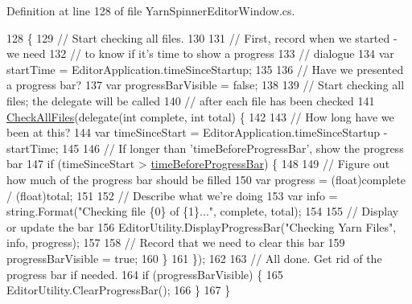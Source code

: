 Definition at line 128 of file Yarn\-Spinner\-Editor\-Window.\-cs.


\begin{DoxyCode}
128                                  \{
129             \textcolor{comment}{// Start checking all files.}
130 
131             \textcolor{comment}{// First, record when we started - we need}
132             \textcolor{comment}{// to know if it's time to show a progress}
133             \textcolor{comment}{// dialogue}
134             var startTime = EditorApplication.timeSinceStartup;
135 
136             \textcolor{comment}{// Have we presented a progress bar?}
137             var progressBarVisible = \textcolor{keyword}{false};
138 
139             \textcolor{comment}{// Start checking all files; the delegate will be called}
140             \textcolor{comment}{// after each file has been checked}
141             \hyperlink{a00166_a8e59ec20bd21bb1f8a6d4f02980f624b}{CheckAllFiles}(delegate(\textcolor{keywordtype}{int} complete, \textcolor{keywordtype}{int} total) \{
142 
143                 \textcolor{comment}{// How long have we been at this?}
144                 var timeSinceStart = EditorApplication.timeSinceStartup - startTime;
145 
146                 \textcolor{comment}{// If longer than 'timeBeforeProgressBar', show the progress bar}
147                 \textcolor{keywordflow}{if} (timeSinceStart > \hyperlink{a00166_a62a14b3fbaf2da41154ebad0eb7b6d3f}{timeBeforeProgressBar}) \{
148 
149                     \textcolor{comment}{// Figure out how much of the progress bar should be filled}
150                     var progress = (float)complete / (\textcolor{keywordtype}{float})total;
151 
152                     \textcolor{comment}{// Describe what we're doing}
153                     var info = string.Format(\textcolor{stringliteral}{"Checking file \{0\} of \{1\}..."}, complete, total);
154 
155                     \textcolor{comment}{// Display or update the bar}
156                     EditorUtility.DisplayProgressBar(\textcolor{stringliteral}{"Checking Yarn Files"}, info, progress);
157 
158                     \textcolor{comment}{// Record that we need to clear this bar}
159                     progressBarVisible = \textcolor{keyword}{true};
160                 \}
161             \});
162 
163             \textcolor{comment}{// All done. Get rid of the progress bar if needed.}
164             \textcolor{keywordflow}{if} (progressBarVisible) \{
165                 EditorUtility.ClearProgressBar();
166             \}
167         \}
\end{DoxyCode}

